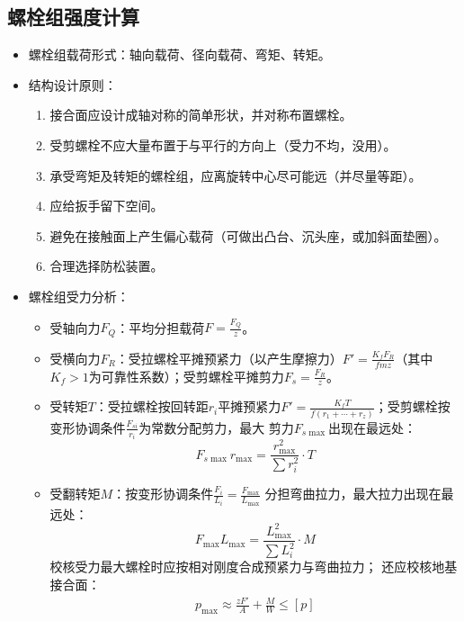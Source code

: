 \documentclass[12pt,a4paper]{article}
\newcommand{\tightlist}{\setlength{\parskip}{0pt}\setlength{\itemsep}{0pt}}
\newcommand{\hint}[1]{\textsf{（#1）}}
\newcommand{\minor}[1]{{\color{gray} #1}}
\begin{document}
\subsection{螺栓组强度计算}
\begin{itemize}\tightlist
    \item 螺栓组载荷形式：轴向载荷、径向载荷、弯矩、转矩。
    \item 结构设计原则：
    \begin{enumerate}\tightlist
        \item 接合面应设计成轴对称的简单形状，并对称布置螺栓。
        \item 受剪螺栓不应大量布置于与平行的方向上\hint{受力不均，没用}。
        \item 承受弯矩及转矩的螺栓组，应离旋转中心尽可能远\hint{并尽量等距}。
        \item 应给扳手留下空间。
        \item 避免在接触面上产生偏心载荷\hint{可做出凸台、沉头座，或加斜面垫圈}。
        \item 合理选择防松装置。
    \end{enumerate}
    \item 螺栓组受力分析：
    \begin{itemize}\tightlist
        \item 受轴向力$F_Q$：平均分担载荷$F=\frac{F_Q}{z}$。
        \item 受横向力$F_R$：受拉螺栓平摊预紧力\hint{以产生摩擦力}$F'=
        \frac{K_fF_R}{fmz}$\hint{其中$K_f>1$为可靠性系数}；受剪螺栓平摊剪力$F_s=
        \frac{F_R}{z}$。
        \item 受转矩$T$：受拉螺栓按回转距$r_i$平摊预紧力$F'=\frac{K_fT}{f(r_1+
        \cdots+r_z)}$；受剪螺栓按变形协调条件$\frac{F_{si}}{r_i}$为常数分配剪力，最大
        剪力$F_{s\max}$出现在最远处：
        \begin{equation}
        F_{s\max}r_{\max}=\frac{r_{\max}^2}{\sum r_i^2}\cdot T
        \end{equation}
        \item 受翻转矩$M$：按变形协调条件$\frac{F_i}{L_i}=\frac{F_{\max}}{L_{\max}}$
        分担弯曲拉力，最大拉力出现在最远处：
        \begin{equation}
        F_{\max}L_{\max}=\frac{L_{\max}^2}{\sum L_i^2}\cdot M
        \end{equation}
        校核受力最大螺栓时应按相对刚度合成预紧力与弯曲拉力；\minor{还应校核地基接合面：
        \begin{gather}
        p_{\max}\approx\frac{zF'}{A}+\frac{M}{W}\leq[p]\\

\end{gather}}
\end{itemize}
\end{itemize}
\end{document}
